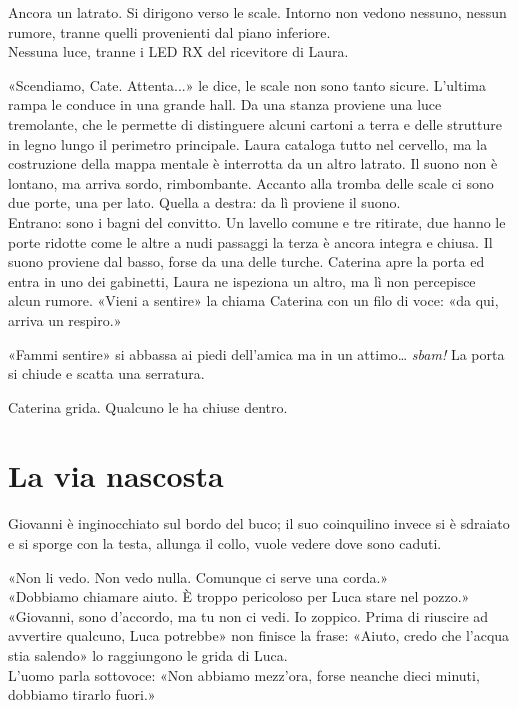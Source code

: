 \documentclass[10pt,oneside]{extbook}
\begin{document}
\par\medskip
Ancora un latrato. Si dirigono verso le scale. Intorno non vedono nessuno, nessun rumore, tranne quelli provenienti dal piano inferiore.\\
Nessuna luce, tranne i LED RX del ricevitore di Laura.

\par\medskip
«Scendiamo, Cate. Attenta...» le dice, le scale non sono tanto sicure. L'ultima rampa le conduce in una grande hall. Da una stanza proviene una luce tremolante, che le permette di distinguere alcuni cartoni a terra e delle strutture in legno lungo il perimetro principale. Laura cataloga tutto nel cervello, ma la costruzione della mappa mentale \`e interrotta da un altro latrato. Il suono non \`e lontano, ma arriva sordo, rimbombante. Accanto alla tromba delle scale ci sono due porte, una per lato. Quella a destra: da lì proviene il suono.\\
Entrano: sono i bagni del convitto. Un lavello comune e tre ritirate, due hanno le porte ridotte come le altre a nudi passaggi la terza \`e ancora integra e chiusa. Il suono proviene dal basso, forse da una delle turche. Caterina apre la porta ed entra in uno dei gabinetti, Laura ne ispeziona un altro, ma l\`i non percepisce alcun rumore.
«Vieni a sentire» la chiama Caterina con un filo di voce: «da qui, arriva un respiro.»

\par\medskip
«Fammi sentire» si abbassa ai piedi dell'amica ma in un attimo… \emph{sbam!}
La porta si chiude e scatta una serratura.

\par\medskip
Caterina grida. Qualcuno le ha chiuse dentro.
\clearpage{}
\clearpage{}\chapter{La via nascosta}

Giovanni \`e inginocchiato sul bordo del buco; il suo coinquilino invece si \`e sdraiato e si  sporge  con la testa, allunga il collo, vuole vedere  dove sono caduti.

«Non li vedo. Non vedo nulla. Comunque ci serve una corda.»\\
«Dobbiamo chiamare aiuto. \`E troppo pericoloso per Luca stare nel pozzo.»\\
«Giovanni, sono d’accordo, ma tu non ci vedi. Io zoppico. Prima di riuscire ad avvertire qualcuno, Luca potrebbe» non finisce la frase:
«Aiuto, credo che l’acqua stia salendo» lo raggiungono le grida di Luca.\\
L'uomo parla sottovoce: «Non abbiamo mezz’ora, forse neanche dieci minuti, dobbiamo tirarlo fuori.»
\end{document}
